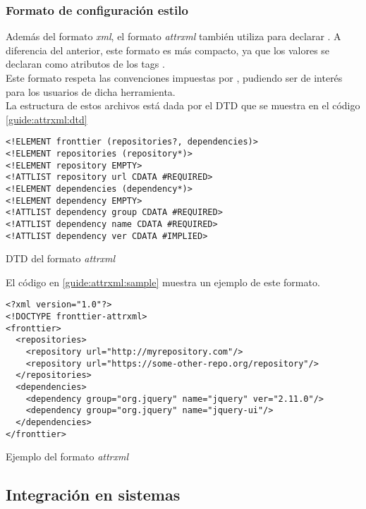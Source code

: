 \subsubsection{Formato de configuración estilo \ivy}
\label{subsubsec:formats:ivy}

Además del formato \emph{xml}, el formato \emph{attrxml} también utiliza \xml 
para declarar \dependencies. A diferencia del anterior, este formato es más 
compacto, ya que los valores se declaran como atributos de los tags \xml.\\
Este formato respeta las convenciones impuestas por \apache \ivy, pudiendo ser 
de interés para los usuarios de dicha herramienta.\\
La estructura de estos archivos está dada por el DTD que se muestra en el código
\ref{guide:attrxml:dtd}

\begin{listing}[ht]
	\begin{verbatim}
<!ELEMENT fronttier (repositories?, dependencies)>
<!ELEMENT repositories (repository*)>
<!ELEMENT repository EMPTY>
<!ATTLIST repository url CDATA #REQUIRED>
<!ELEMENT dependencies (dependency*)>
<!ELEMENT dependency EMPTY>
<!ATTLIST dependency group CDATA #REQUIRED>
<!ATTLIST dependency name CDATA #REQUIRED>
<!ATTLIST dependency ver CDATA #IMPLIED>
	\end{verbatim}
	\caption{DTD del formato \emph{attrxml}}
	\label{guide:attrxml:dtd}
\end{listing}

El código en \ref{guide:attrxml:sample} muestra un ejemplo de este formato.

\begin{listing}[ht]
\begin{verbatim}
<?xml version="1.0"?>
<!DOCTYPE fronttier-attrxml>
<fronttier>
  <repositories>
    <repository url="http://myrepository.com"/>
    <repository url="https://some-other-repo.org/repository"/>
  </repositories>	
  <dependencies>
    <dependency group="org.jquery" name="jquery" ver="2.11.0"/>
    <dependency group="org.jquery" name="jquery-ui"/>
  </dependencies>
</fronttier>
\end{verbatim}
\caption{Ejemplo del formato \emph{attrxml}}
\label{guide:attrxml:sample}
\end{listing}


\subsection{Integración en sistemas}
\label{subsec:guide:systems}

